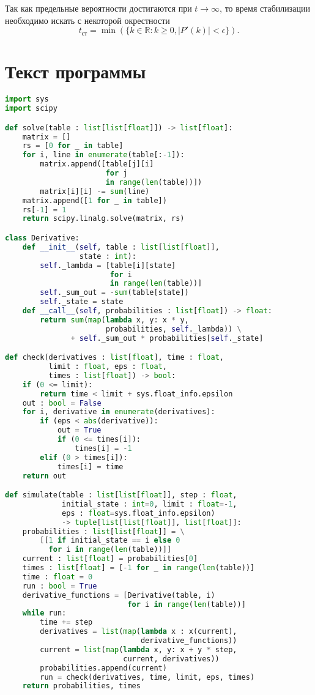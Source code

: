 Так как предельные вероятности достигаются при $t \rightarrow \infty$, то
время стабилизации необходимо искать с некоторой окрестности
\begin{equation*}
    t_\text{ст} = \min (\{k \in \mathbb{R} : k \geq 0, |P'(k)| < \epsilon\}).
\end{equation*}


\section*{Текст программы}
\begin{lstlisting}[caption={Нахождение предельных вероятностей}, language=python]
import sys
import scipy

def solve(table : list[list[float]]) -> list[float]:
    matrix = []
    rs = [0 for _ in table]
    for i, line in enumerate(table[:-1]):
        matrix.append([table[j][i]
                       for j
                       in range(len(table))])
        matrix[i][i] -= sum(line)
    matrix.append([1 for _ in table])
    rs[-1] = 1
    return scipy.linalg.solve(matrix, rs)

class Derivative:
    def __init__(self, table : list[list[float]],
                 state : int):
        self._lambda = [table[i][state]
                        for i
                        in range(len(table))]
        self._sum_out = -sum(table[state])
        self._state = state
    def __call__(self, probabilities : list[float]) -> float:
        return sum(map(lambda x, y: x * y,
                       probabilities, self._lambda)) \
               + self._sum_out * probabilities[self._state]

def check(derivatives : list[float], time : float,
          limit : float, eps : float,
          times : list[float]) -> bool:
    if (0 <= limit):
        return time < limit + sys.float_info.epsilon
    out : bool = False
    for i, derivative in enumerate(derivatives):
        if (eps < abs(derivative)):
            out = True
            if (0 <= times[i]):
                times[i] = -1
        elif (0 > times[i]):
            times[i] = time
    return out

def simulate(table : list[list[float]], step : float,
             initial_state : int=0, limit : float=-1,
             eps : float=sys.float_info.epsilon)
             -> tuple[list[list[float]], list[float]]:
    probabilities : list[list[float]] = \
        [[1 if initial_state == i else 0
          for i in range(len(table))]]
    current : list[float] = probabilities[0]
    times : list[float] = [-1 for _ in range(len(table))]
    time : float = 0
    run : bool = True
    derivative_functions = [Derivative(table, i)
                            for i in range(len(table))]
    while run:
        time += step
        derivatives = list(map(lambda x : x(current),
                               derivative_functions))
        current = list(map(lambda x, y: x + y * step,
                           current, derivatives))
        probabilities.append(current)
        run = check(derivatives, time, limit, eps, times)
    return probabilities, times
\end{lstlisting}

